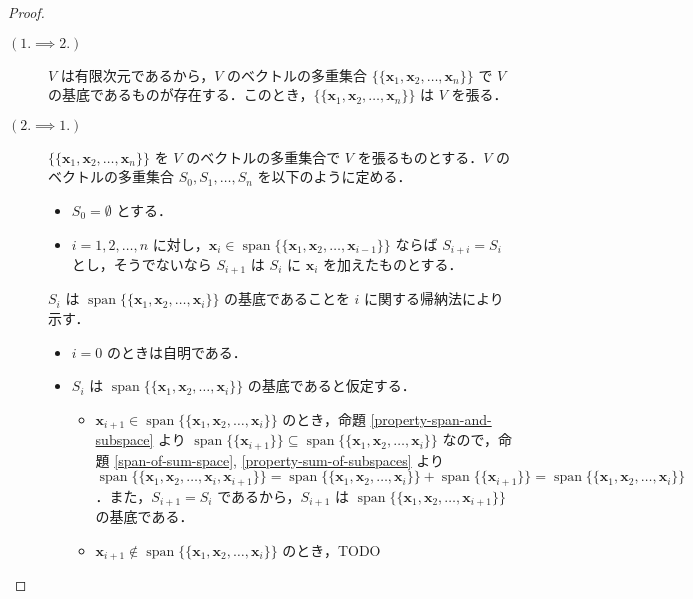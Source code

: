 \documentclass{jlreq}
\theoremstyle{definition}
\DeclareMathOperator{\Span}{span}
\begin{document}
      \begin{proof}
        \mbox{}
        \begin{description}
          \item [$(1. \implies 2.) \, $]
            \mbox{}
            
            $V$ は有限次元であるから，$V$ のベクトルの多重集合 $\{\{\bm{x}_1, \bm{x}_2, \dots, \bm{x}_n\}\}$ で $V$ の基底であるものが存在する．このとき，$\{\{\bm{x}_1, \bm{x}_2, \dots, \bm{x}_n\}\}$ は $V$ を張る．
          \item [$(2. \implies 1.) \, $]
            \mbox{}

            $\{\{\bm{x}_1, \bm{x}_2, \dots, \bm{x}_n\}\}$ を $V$ のベクトルの多重集合で $V$ を張るものとする．$V$ のベクトルの多重集合 $S_0, S_1, \dots, S_n$ を以下のように定める．

            \begin{itemize}
              \item $S_0 = \emptyset$ とする．
              \item $i=1,2,\dots,n$ に対し，$\bm{x}_i \in \Span\{\{\bm{x}_1, \bm{x}_2, \dots, \bm{x}_{i-1}\}\}$ ならば $S_{i+i} = S_i$ とし，そうでないなら $S_{i+1}$ は $S_i$ に $\bm{x}_i$ を加えたものとする．
            \end{itemize}

            $S_i$ は $\Span \{\{\bm{x}_1, \bm{x}_2, \dots, \bm{x}_i\}\}$ の基底であることを $i$ に関する帰納法により示す．
            
            \begin{itemize}
              \item $i=0$ のときは自明である．
              \item $S_i$ は $\Span \{\{\bm{x}_1, \bm{x}_2, \dots, \bm{x}_i\}\}$ の基底であると仮定する．
              \begin{itemize}
                \item $\bm{x}_{i+1} \in \Span\{\{\bm{x}_1, \bm{x}_2, \dots, \bm{x}_i\}\}$ のとき，命題 \ref{property-span-and-subspace} より $\Span \{\{\bm{x}_{i+1}\}\} \subseteq \Span\{\{\bm{x}_1, \bm{x}_2, \dots, \bm{x}_i\}\}$ なので，命題 \ref{span-of-sum-space}, \ref{property-sum-of-subspaces} より $\Span\{\{\bm{x}_1, \bm{x}_2, \dots, \bm{x}_i, \bm{x}_{i+1}\}\} = \Span\{\{\bm{x}_1, \bm{x}_2, \dots, \bm{x}_i\}\}+\Span\{\{\bm{x}_{i+1}\}\}=\Span\{\{\bm{x}_1, \bm{x}_2, \dots, \bm{x}_i\}\}$．また，$S_{i+1}=S_i$ であるから，$S_{i+1}$ は $\Span\{\{\bm{x}_1, \bm{x}_2, \dots, \bm{x}_{i+1}\}\}$ の基底である．
                \item $\bm{x}_{i+1} \notin \Span\{\{\bm{x}_1, \bm{x}_2, \dots, \bm{x}_i\}\}$ のとき，TODO
              \end{itemize}
            \end{itemize}
        \end{description}
      \end{proof}
\end{document}

